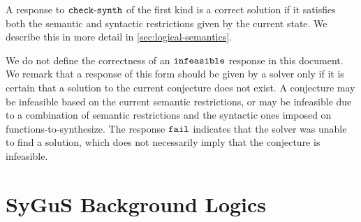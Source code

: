 \documentclass[english,a4paper,10pt]{article}
\begin{document}
\begin{itemize}
A response to ${\tt check\mbox{-}synth}$ of the first kind is a correct solution if
it satisfies both the semantic and syntactic restrictions given by
the current state.
We describe this in more detail in \cref{sec:logical-semantics}.

We do not define the correctness of an ${\tt infeasible}$ response 
in this document. 
We remark that a response of this form should be given
by a solver only if it is certain that a solution to the current
conjecture does not exist.
A conjecture may be infeasible based on the current semantic
restrictions, or may be infeasible due to a combination
of semantic restrictions and the syntactic ones imposed on functions-to-synthesize.
The response ${\tt fail}$ indicates that the solver
was unable to find a solution, which does not necessarily imply that
the conjecture is infeasible.

\end{itemize}


\section{SyGuS Background Logics}
\label{sec:sygus-logic}
\end{document}
